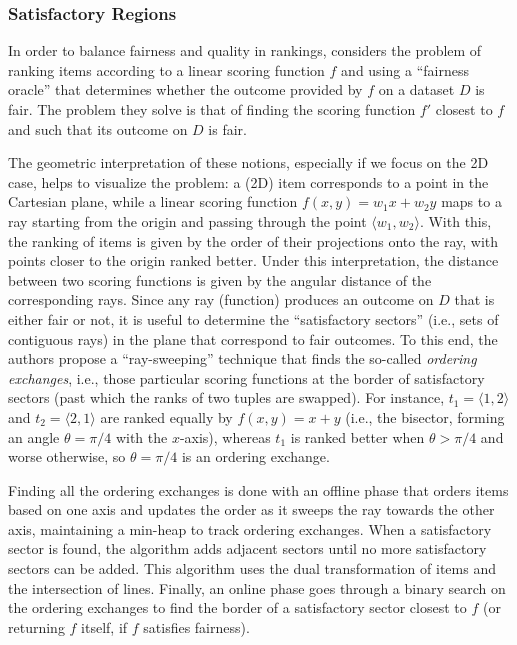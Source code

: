 \subsubsection{Satisfactory Regions}
\label{subsec:intrank_meth_constr_13n}

In order to balance fairness and quality in rankings, \cite{asudeh2019designing} considers the problem of ranking items according to a linear scoring function $f$ and using a ``fairness oracle'' that determines whether the outcome provided by $f$ on a dataset $D$ is fair. The problem they solve is that of finding the scoring function $f'$ closest to $f$ and such that its outcome on $D$ is fair.

The geometric interpretation of these notions, especially if we focus on the 2D case, helps to visualize the problem:
a (2D) item corresponds to a point in the Cartesian plane, while a linear scoring function $f(x,y)=w_1 x + w_2 y$ maps to a ray starting from the origin and passing through the point $\langle w_1, w_2\rangle$. With this, the ranking of items is given by the order of their projections onto the ray, with points closer to the origin ranked better.
Under this interpretation, the distance between two scoring functions is given by the angular distance of the corresponding rays.
Since any ray (function) produces an outcome on $D$ that is either fair or not, it is useful to determine the ``satisfactory sectors'' (i.e., sets of contiguous rays) in the plane that correspond to fair outcomes. To this end, the authors propose a ``ray-sweeping'' technique that finds the so-called \emph{ordering exchanges}, i.e., those particular scoring functions at the border of satisfactory sectors (past which the ranks of two tuples are swapped).
For instance, $t_1=\langle 1, 2\rangle$ and $t_2=\langle 2,1 \rangle$ are ranked equally by $f(x,y)=x+y$ (i.e., the bisector, forming an angle $\theta=\pi/4$ with the $x$-axis), whereas $t_1$ is ranked better when $\theta>\pi/4$ and worse otherwise, so $\theta=\pi/4$ is an ordering exchange.

Finding all the ordering exchanges is done with an offline phase
that orders items based on one axis and updates the order as it sweeps the ray towards the other axis, maintaining a min-heap to track ordering exchanges. When a satisfactory sector is found, the algorithm adds adjacent sectors until no more satisfactory sectors can be added. This algorithm uses the dual transformation of items and the intersection of lines.
Finally, an online phase goes through a binary search on the ordering exchanges to find the border of a satisfactory sector closest to $f$ (or returning $f$ itself, if $f$ satisfies fairness).

